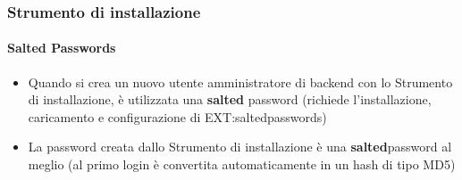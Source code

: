 \begin{frame}[fragile]
\begin{columns}[T]
\begin{column}{.7\textwidth}
\begin{figure}
			\end{figure}
		\end{column}
	\end{columns}

\end{frame}


\begin{frame}[fragile]
	\frametitle{Strumento di installazione}
	\framesubtitle{Salted Passwords}

	\begin{itemize}
		\item Quando si crea un nuovo utente amministratore di backend con lo\newline 
			Strumento di installazione, è utilizzata una \textbf{salted} password\newline
			(richiede l'installazione, caricamento e configurazione di EXT:saltedpasswords)
		\item La password creata dallo Strumento di installazione è una \textbf{salted}\newline password al meglio
			(al primo login è convertita automaticamente in un hash di tipo MD5)
	\end{itemize}


\end{frame}
